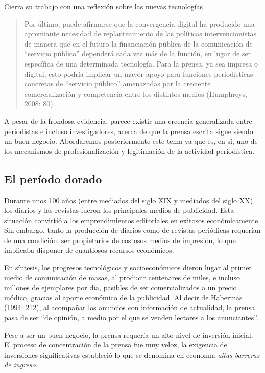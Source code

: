 Cierra su trabajo con una reflexión sobre las nuevas tecnologías

\begin{quote}
Por último, puede afirmarse que la convergencia digital ha producido una apremiante necesidad de replanteamiento de las políticas intervencionistas de manera que en el futuro la financiación pública de la comunicación de \enquote{servicio público} dependerá cada vez más de la función, en lugar de ser específica de una determinada tecnología. Para la prensa, ya sea impresa o digital, esto podría implicar un mayor apoyo  para funciones periodísticas concretas de \enquote{servicio público} amenazadas por la creciente comercialización y competencia entre los distintos medios (Humphreys, 2008: 80).
\end{quote}

A pesar de la frondosa evidencia, parece existir una creencia generalizada entre periodistas e incluso investigadores, acerca de que la prensa escrita sigue siendo un buen negocio. Abordaremos posteriormente este tema ya que es, en sí, uno de los mecanismos de profesionalización y legitimación de la actividad periodística.

\subsection{El período dorado}

Durante unos 100 años (entre mediados del siglo XIX y mediados del siglo XX) los diarios y las revistas fueron los principales medios de publicidad. Esta situación convirtió a los emprendimientos editoriales en exitosos económicamente. Sin embargo, tanto la producción de diarios como de revistas periódicas requerían de una condición: ser propietarios de costosos medios de impresión, lo que implicaba disponer de cuantiosos recursos económicos.

En síntesis, los progresos tecnológicos y socioeconómicos dieron lugar al primer medio de comunicación de masas, al producir centenares de miles, e incluso millones de ejemplares por día, pasibles de ser comercializados a un precio módico, gracias al aporte económico de la publicidad. Al decir de Habermas (1994: 212), al acompañar los anuncios con información de actualidad, la prensa pasa de ser \enquote{de opinión, a medio por el que se venden lectores a los anunciantes}.

Pese a ser un buen negocio, la prensa requería un alto nivel de inversión inicial. El proceso de concentración de la prensa fue muy veloz, la exigencia de inversiones significativas estableció lo que se denomina en economía \emph{altas barreras de ingreso}.

